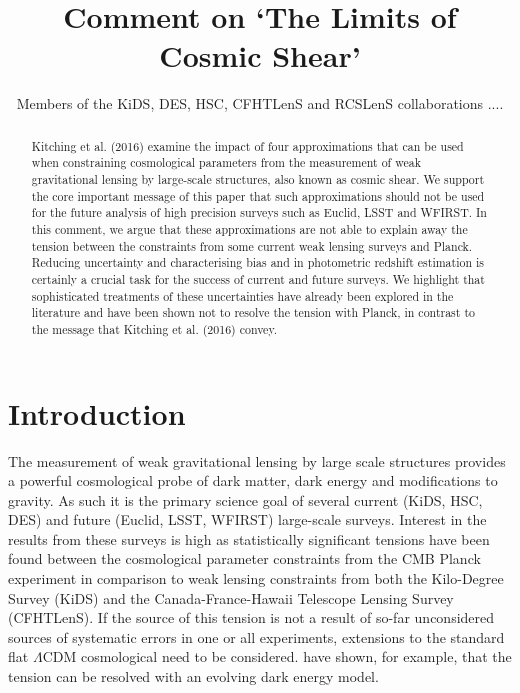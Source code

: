 \documentclass[preprint]{aastex}
\begin{document}
\title{\huge{Comment on `The Limits of Cosmic Shear'}}

\author{Members of the KiDS, DES, HSC, CFHTLenS and RCSLenS collaborations ....}


\begin{abstract}
Kitching et al. (2016) examine the impact of four approximations that can be used when constraining cosmological parameters from the measurement of weak gravitational lensing by large-scale structures, also known as cosmic shear.  We support the core important message of this paper that such approximations should not be used for the future analysis of high precision surveys such as Euclid, LSST and WFIRST.  In this comment, we argue that these approximations are not able to explain away the tension between the constraints from some current weak lensing surveys and Planck.  Reducing uncertainty and characterising bias and in photometric redshift estimation is certainly a crucial task for the success of current and future surveys.  We highlight that sophisticated treatments of these uncertainties have already been explored in the literature and have been shown not to resolve the tension with Planck, in contrast to the message that Kitching et al. (2016) convey.

\end{abstract}
\section{Introduction}

The measurement of weak gravitational lensing by large scale structures provides a powerful cosmological probe of dark matter, dark energy and modifications to gravity.  As such it is the primary science goal of several current (KiDS, HSC, DES) and future (Euclid, LSST, WFIRST) large-scale surveys.   Interest in the results from these surveys is high as statistically significant tensions have been found between the cosmological parameter constraints from the CMB Planck experiment \citep{planck/cosmo:2015} in comparison to weak lensing constraints from both the Kilo-Degree Survey (KiDS) and the Canada-France-Hawaii Telescope Lensing Survey (CFHTLenS).  If the source of this tension is not a result of so-far unconsidered sources of systematic errors in one or all experiments, extensions to the standard flat $\Lambda$CDM cosmological need to be considered.  \citet{joudaki/etal:2017} have shown, for example, that the tension can be resolved with an evolving dark energy model.
\end{document}
